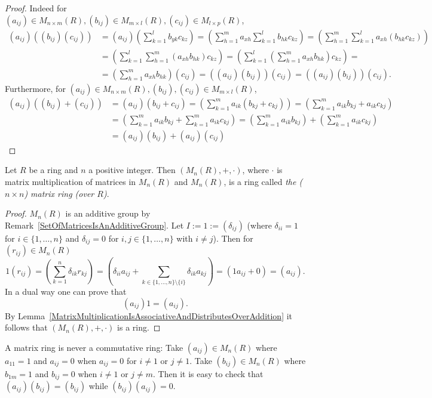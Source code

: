 \begin{proof}
    Indeed for $(a_{ij})\in M_{n\times m}(R),(b_{ij}) \in M_{m\times l}(R), (c_{ij})\in M_{l\times p}(R)$,
    \begin{align*}(a_{ij})\left((b_{ij})(c_{ij})\right) &=  (a_{ij})\left(\sum_{k=1}^l b_{yk}c_{kz}\right) = \left(\sum_{h=1}^m a_{xh}\sum_{k=1}^l b_{hk}c_{kz}\right) = \left(\sum_{h=1}^m \sum_{k=1}^l a_{xh}(b_{hk}c_{kz})\right) \\ &= \left( \sum_{k=1}^l \sum_{h=1}^m (a_{xh}b_{hk})c_{kz}\right) = \left(\sum_{k=1}^l \left(\sum_{h=1}^m a_{xh}b_{hk}\right)c_{kz}\right)  = \\
    &= \left(\sum_{h=1}^m a_{xh}b_{hk}\right) (c_{ij}) = \left((a_{ij})(b_{ij})\right)(c_{ij})  =\left((a_{ij})(b_{ij})\right)(c_{ij}). \end{align*}
    Furthermore, for $(a_{ij})\in M_{n\times m}(R),(b_{ij}), (c_{ij})\in M_{m\times l}(R)$,
    \begin{align*}
        (a_{ij})\left((b_{ij})+(c_{ij})\right) &= (a_{ij})(b_{ij}+c_{ij}) = \left(\sum_{k=1}^m a_{ik}(b_{kj}+c_{kj}) \right) = \left(\sum_{k=1}^m a_{ik}b_{kj}+a_{ik}c_{kj}\right) \\
        &= \left(\sum_{k=1}^m a_{ik}b_{kj}+ \sum_{k=1}^ma_{ik}c_{kj}\right) = \left(\sum_{k=1}^m a_{ik}b_{kj}\right)+ \left(\sum_{k=1}^ma_{ik}c_{kj}\right)
        \\ 
        &=  (a_{ij})(b_{ij}) + (a_{ij})(c_{ij})
    \end{align*}
\end{proof}
\begin{lemma}\label{MatrixRingIsRing}
    Let $R$ be a ring and $n$ a positive integer. Then $(M_n(R),+,\cdot)$, where $\cdot$ is matrix multiplication of matrices in $M_n(R)$ and $M_n(R)$, is a ring called \textit{the ($n\times n$) matrix ring (over $R$)}. 
\end{lemma}
\begin{proof}
    $M_n(R)$ is an additive group by Remark~\ref{SetOfMatricesIsAnAdditiveGroup}. Let $I:=1:=  (\delta_{ij})$ (where $\delta_{ii}=1$ for $i\in \{1,\dots,n\}$ and $\delta_{ij} = 0$ for $i,j\in\{1,\dots,n\}$ with $i \neq j$). Then for $(r_{ij})\in M_n(R)$ 
    $$1(r_{ij}) = \left(\sum_{k=1}^n \delta_{ik}r_{kj}\right) = \left(\delta_{ii}a_{ij} +\sum_{k\in\{1,\dots,n\}\setminus\{i\}}\delta_{ik}a_{kj} \right) = (1a_{ij}+0)=(a_{ij}).$$
    In a dual way one can prove that 
    $$(a_{ij})1= (a_{ij}).$$
    By Lemma~\ref{MatrixMultiplicationIsAssociativeAndDistributesOverAddition} it follows that $(M_n(R),+,\cdot)$ is a ring.
\end{proof}
\begin{example}
    A matrix ring is never a commutative ring: Take $(a_{ij})\in M_n(R)$ where $a_{11}= 1$ and $a_{ij} = 0$ when $a_{ij} =0$ for $i\neq 1$ or $j\neq 1$. Take $(b_{ij})\in M_n(R)$ where $b_{1m} =1$ and $b_{ij}=0$ when $i \neq 1$ or $j \neq m$. Then it is easy to check that $(a_{ij})(b_{ij}) = (b_{ij})$ while $(b_{ij})(a_{ij}) = 0$.
\end{example}
